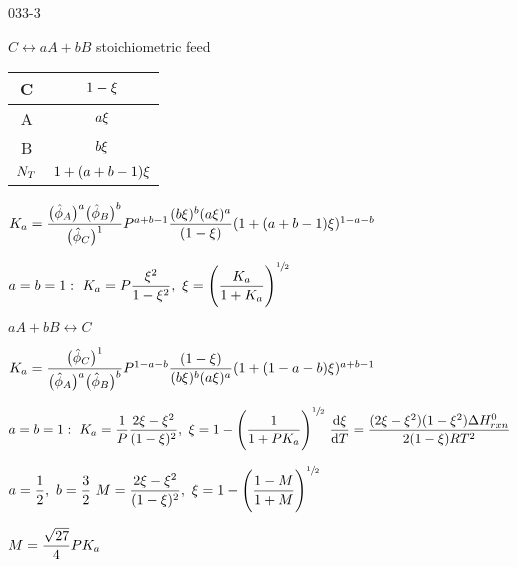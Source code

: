 \begin{mitframe}{033-3}

    
 \begin{listone}
    
    \item $C\leftrightarrow aA+bB$ stoichiometric feed

 	\item
    \begin{tabular}{|c|c|}
    \hline
    C & $1-\extent$\\ \hline
    A & $a\extent$\\ \hline
    B & $b\extent$ \\ \hline
    $\nummoles_{\Temp}$ & $1+(a+b-1)\extent$ \\ \hline
    \end{tabular} 
    
    \item $\eqconst = \dfrac{\big(\hat{\fugcoeff}_{A}\big)^{a}\big(\hat{\fugcoeff}_{B}\big)^{b}}{\big(\hat{\fugcoeff}_{C}\big)^{1}}\p^{a+b-1}\dfrac{(b\extent)^{b}(a\extent)^{a}}{(1-\extent)}(1+(a+b-1)\extent)^{1-a-b}$
    
    \item $a=b=1:~\eqconst=\p\dfrac{\extent^{2}}{1-\extent^{2}},~\extent=\Bigg(\dfrac{\eqconst}{1+\eqconst}\Bigg)^{\sfrac{1}{2}}$
    
    \item $aA+bB \leftrightarrow  C$       
    
	\item $\eqconst = \dfrac{\big(\hat{\fugcoeff}_{C}\big)^{1}}{\big(\hat{\fugcoeff}_{A}\big)^{a}\big(\hat{\fugcoeff}_{B}\big)^{b}}\p^{1-a-b}\dfrac{(1-\extent)}{(b\extent)^{b}(a\extent)^{a}}(1+(1-a-b)\extent)^{a+b-1}$
    
    \item $a=b=1:~ \eqconst=\dfrac{1}{\p}\dfrac{2\extent-\extent^{2}}{(1-\extent)^{2}},~\extent=1-\Bigg(\dfrac{1}{1+\p\eqconst}\Bigg)^{\sfrac{1}{2}}~\dfrac{\mathrm{d}\extent}{\mathrm{d}\Temp}=\dfrac{(2\extent-\extent^{2})(1-\extent^{2})\iipf\enthalpy_{rxn}^{\init}}{2(1-\extent)\gasconst\Temp^{2}}$
    
    \item $a=\dfrac{1}{2},~b=\dfrac{3}{2}~M=\dfrac{2\extent-\extent^{2}}{(1-\extent)^{2}},~\extent=1-\Bigg(\dfrac{1-M}{1+M}\Bigg)^{\sfrac{1}{2}}$
    
    \item $M=\dfrac{\sqrt{27}}{4}\p\eqconst$

	\end{listone}    

\end{mitframe}